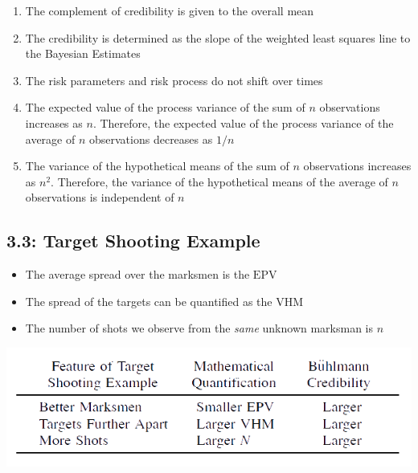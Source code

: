 \documentclass[
]{article}
\begin{document}
\begin{red}

\begin{enumerate}
\def\labelenumi{\arabic{enumi}.}
\item
  The complement of credibility is given to the overall mean
\item
  The credibility is determined as the slope of the weighted least
  squares line to the Bayesian Estimates
\item
  The risk parameters and risk process do not shift over times
\item
  The expected value of the process variance of the sum of \(n\)
  observations increases as \(n\). Therefore, the expected value of the
  process variance of the average of \(n\) observations decreases as
  \(1/n\)
\item
  The variance of the hypothetical means of the sum of \(n\)
  observations increases as \(n^2\). Therefore, the variance of the
  hypothetical means of the average of \(n\) observations is independent
  of \(n\)
\end{enumerate}

\end{red}

\hypertarget{target-shooting-example}{%
\subsection{3.3: Target Shooting
Example}\label{target-shooting-example}}

\begin{purple}

\begin{itemize}
\item
  The average spread over the marksmen is the \(\text{EPV}\)
\item
  The spread of the targets can be quantified as the \(\text{VHM}\)
\item
  The number of shots we observe from the \emph{same} unknown marksman
  is \(n\)
\end{itemize}

\includegraphics{Figures/5+.png}

\end{purple}
\end{document}
